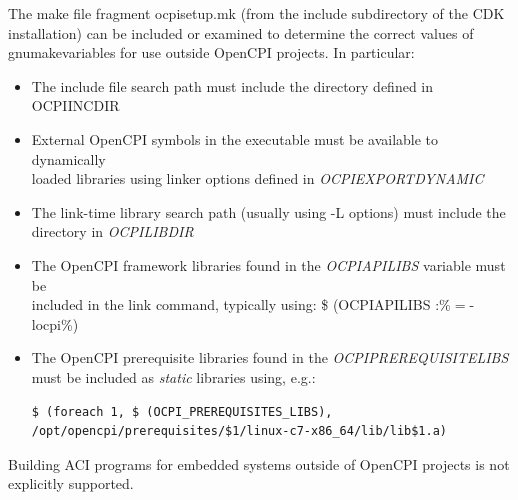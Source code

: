 \documentclass[10pt, a4paper, oneside]{article}
\renewcommand\_{\textunderscore\allowbreak} %
\begin{document}
The make file fragment ocpisetup.mk (from the include subdirectory of the CDK installation) can be included or examined to determine the correct values of gnumakevariables for use outside OpenCPI projects.  In particular:
\begin{itemize}
\item The include file search path must include the directory defined in {OCPI\_INC\_DIR}
\item  External OpenCPI symbols in the executable must be available to dynamically\\
loaded libraries using linker options defined in \emph{OCPI\_EXPORT\_DYNAMIC}
\item The link-time library search path (usually using -L options) must include the\\
directory in \emph{OCPI\_LIB\_DIR}
\item The OpenCPI framework libraries found in the \emph{OCPI\_API\_LIBS} variable must be\\
 included in the link command, typically using: \$ (OCPI\_API\_LIBS :\%$=$-locpi\_\%)
\item The OpenCPI prerequisite libraries found in the \emph{OCPI\_PREREQUISITE\_LIBS}\\
 must be included as \emph{static} libraries using, e.g.:
\begin{verbatim}$ (foreach 1, $ (OCPI_PREREQUISITES_LIBS), 
/opt/opencpi/prerequisites/$1/linux-c7-x86_64/lib/lib$1.a)\end{verbatim}
\end{itemize}
Building ACI programs for embedded systems outside of OpenCPI projects is not explicitly supported.
\end{document}
